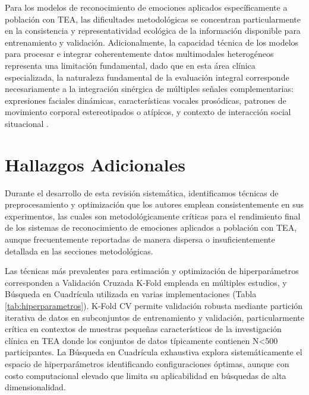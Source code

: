 \documentclass{ieeeaccess}
\begin{document}
	Para los modelos de reconocimiento de emociones aplicados específicamente a población con TEA, las dificultades metodológicas se concentran particularmente en la consistencia y representatividad ecológica de la información disponible para entrenamiento y validación. Adicionalmente, la capacidad técnica de los modelos para procesar e integrar coherentemente datos multimodales heterogéneos representa una limitación fundamental, dado que en esta área clínica especializada, la naturaleza fundamental de la evaluación integral corresponde necesariamente a la integración sinérgica de múltiples señales complementarias: expresiones faciales dinámicas, características vocales prosódicas, patrones de movimiento corporal estereotipados o atípicos, y contexto de interacción social situacional \cite{b1,b2}.
	
	\section{Hallazgos Adicionales}
	\label{sec:hallazgos}
	
	Durante el desarrollo de esta revisión sistemática, identificamos técnicas de preprocesamiento y optimización que los autores emplean consistentemente en sus experimentos, las cuales son metodológicamente críticas para el rendimiento final de los sistemas de reconocimiento de emociones aplicados a población con TEA, aunque frecuentemente reportadas de manera dispersa o insuficientemente detallada en las secciones metodológicas.
	
	Las técnicas más prevalentes para estimación y optimización de hiperparámetros corresponden a Validación Cruzada K-Fold empleada en múltiples estudios, y Búsqueda en Cuadrícula utilizada en varias implementaciones (Tabla \ref{tab:hiperparametros}). K-Fold CV permite validación robusta mediante partición iterativa de datos en subconjuntos de entrenamiento y validación, particularmente crítica en contextos de muestras pequeñas característicos de la investigación clínica en TEA donde los conjuntos de datos típicamente contienen N<500 participantes. La Búsqueda en Cuadrícula exhaustiva explora sistemáticamente el espacio de hiperparámetros identificando configuraciones óptimas, aunque con costo computacional elevado que limita su aplicabilidad en búsquedas de alta dimensionalidad.
	
\end{document}
